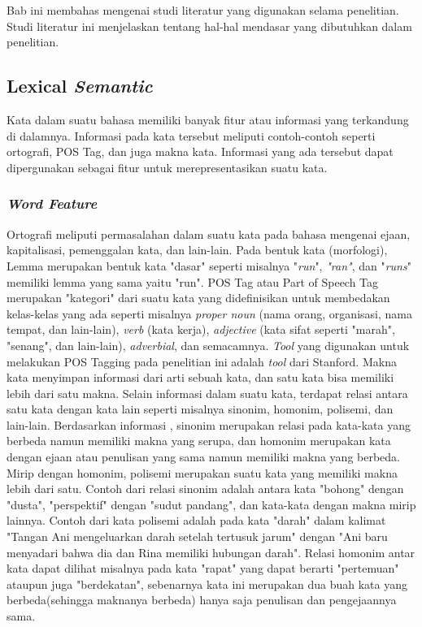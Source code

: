 \chapter{\babDua}
Bab ini membahas mengenai studi literatur yang digunakan selama penelitian. Studi literatur ini menjelaskan tentang hal-hal mendasar yang dibutuhkan dalam penelitian.

\section{Lexical \textit{Semantic}}

Kata dalam suatu bahasa memiliki banyak fitur atau informasi yang terkandung di dalamnya. Informasi pada kata tersebut meliputi contoh-contoh seperti ortografi, POS Tag, dan juga makna kata. Informasi yang ada tersebut dapat dipergunakan sebagai fitur untuk merepresentasikan suatu kata.

\subsection{\textit{Word Feature}}
Ortografi meliputi permasalahan dalam suatu kata pada bahasa mengenai ejaan, kapitalisasi, pemenggalan kata, dan lain-lain. Pada bentuk kata (morfologi), Lemma merupakan bentuk kata "dasar" seperti misalnya "\textit{run}", \textit{"ran"}, dan "\textit{runs}" memiliki lemma yang sama yaitu "run". POS Tag atau Part of Speech Tag merupakan "kategori" dari suatu kata yang didefinisikan untuk membedakan kelas-kelas yang ada seperti misalnya \textit{proper noun} (nama orang, organisasi, nama tempat, dan lain-lain), \textit{verb} (kata kerja), \textit{adjective} (kata sifat seperti "marah", "senang", dan lain-lain), \textit{adverbial}, dan semacamnya. \textit{Tool} yang digunakan untuk melakukan POS Tagging pada penelitian ini adalah \textit{tool} dari Stanford. Makna kata menyimpan informasi dari arti sebuah kata, dan satu kata bisa memiliki lebih dari satu makna. Selain informasi dalam suatu kata, terdapat relasi antara satu kata dengan kata lain seperti misalnya sinonim, homonim, polisemi, dan lain-lain. Berdasarkan informasi \citep{sheeba2013unsupervised}, sinonim merupakan relasi pada kata-kata yang berbeda namun memiliki makna yang serupa, dan homonim merupakan kata dengan ejaan atau penulisan yang sama namun memiliki makna yang berbeda. Mirip dengan homonim, polisemi merupakan suatu kata yang memiliki makna lebih dari satu. Contoh dari relasi sinonim adalah antara kata "bohong" dengan "dusta", "perspektif" dengan "sudut pandang", dan kata-kata dengan makna mirip lainnya. Contoh dari kata polisemi adalah pada kata "darah" dalam kalimat "Tangan Ani mengeluarkan darah setelah tertusuk jarum" dengan "Ani baru menyadari bahwa dia dan Rina memiliki hubungan darah". Relasi homonim antar kata dapat dilihat misalnya pada kata "rapat" yang dapat berarti "pertemuan" ataupun juga "berdekatan", sebenarnya kata ini merupakan dua buah kata yang berbeda(sehingga maknanya berbeda) hanya saja penulisan dan pengejaannya sama.

